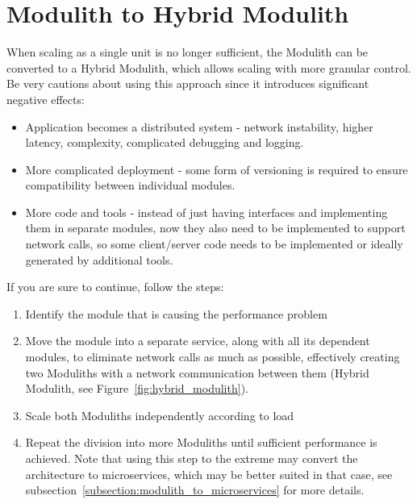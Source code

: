 \section{Modulith to Hybrid Modulith}
\label{subsection:modulith_to_hybrid_modulith}
When scaling as a single unit is no longer sufficient, the Modulith can be converted to a Hybrid Modulith, which allows scaling with more granular control. Be very cautions about using this approach since it introduces significant negative effects:
\begin{itemize}
    \item Application becomes a distributed system - network instability, higher latency, complexity, complicated debugging and logging.
    \item More complicated deployment - some form of versioning is required to ensure compatibility between individual modules.
    \item More code and tools - instead of just having interfaces and implementing them in separate modules, now they also need to be implemented to support network calls, so some client/server code needs to be implemented or ideally generated by additional tools.
\end{itemize}

If you are sure to continue, follow the steps:
\begin{enumerate}
    \item Identify the module that is causing the performance problem
    \item Move the module into a separate service, along with all its dependent modules, to eliminate network calls as much as possible, effectively creating two Moduliths with a network communication between them (Hybrid Modulith, see Figure~\ref{fig:hybrid_modulith}).
    \item Scale both Moduliths independently according to load
    \item Repeat the division into more Moduliths until sufficient performance is achieved. Note that using this step to the extreme may convert the architecture to microservices, which may be better suited in that case, see subsection~\ref{subsection:modulith_to_microservices} for more details.
\end{enumerate}


